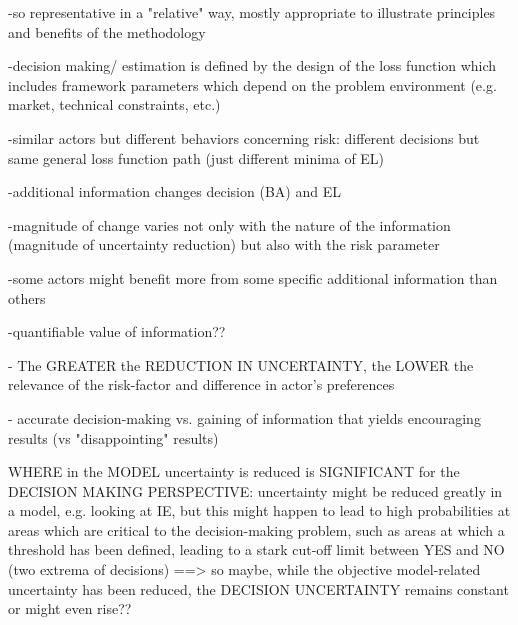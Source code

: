 				-so representative in a "relative" way, mostly appropriate to illustrate principles and benefits of the methodology
				
				-decision making/ estimation is defined by the design of the loss function which includes framework parameters which depend on the problem environment (e.g. market, technical constraints, etc.)
			
				-similar actors but different behaviors concerning risk: different decisions but same general loss function path (just different minima of EL)
			
				-additional information changes decision (BA) and EL
			
				-magnitude of change varies not only with the nature of the information (magnitude of uncertainty reduction) but also with the risk parameter
			
				-some actors might benefit more from some specific additional information than others
			
				-quantifiable value of information??
				
				
				
				
				- The GREATER the REDUCTION IN UNCERTAINTY, the LOWER the relevance of the risk-factor and difference in actor's preferences
				
				- accurate decision-making vs. gaining of information that yields encouraging results (vs "disappointing" results)
				
				
				
	WHERE in the MODEL uncertainty is reduced is SIGNIFICANT for the DECISION MAKING PERSPECTIVE:
	uncertainty might be reduced greatly in a model, e.g. looking at IE,
	but this might happen to lead to high probabilities at areas which are critical to the decision-making problem, such as areas at which a threshold has been defined, leading to a stark cut-off limit between YES and NO (two extrema of decisions)
	==> so maybe, while the objective model-related uncertainty has been reduced, the DECISION UNCERTAINTY remains constant or might even rise??